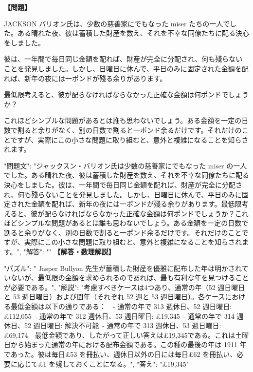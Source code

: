\documentclass[10pt,a4paper,oneside,openany]{ltjsbook}
\begin{document}
\begin{tcolorbox}[colback=softblue,colframe=primaryblue,title=\textbf{第 116 問：THE CONVERTED MISER.},arc=2mm,boxrule=1pt,breakable]
\textbf{【問題】}\par\vspace{0.3em}
JACKSON バリオン氏は、少数の慈善家にでもなった miser たちの一人でした。ある晴れた夜、彼は蓄積した財産を数え、それを不幸な同僚たちに配る決心をしました。

彼は、一年間で毎日同じ金額を配れば、財産が完全に分配され、何も殘らないことを発見しました。しかし、日曜日に休んで、平日のみに固定された金額を配れば、新年の夜には一ポンドが殘る余りがあります。

最低限考えると、彼が配らなければならなかった正確な金額は何ポンドでしょうか？

これほどシンプルな問題があるとは誰も思わないでしょう。ある金額を一定の日数で割ると余りがなく、別の日数で割ると一ポンド余るだけです。それだけのことですが、実際にこの小さな問題に取り組むと、意外と複雑になることを知らされます。

{
  "問題文": "ジャックスン・バリオン氏は少数の慈善家にでもなった miser の一人でした。ある晴れた夜、彼は蓄積した財産を数え、それを不幸な同僚たちに配る決心をしました。彼は、一年間で毎日同じ金額を配れば、財産が完全に分配され、何も殘らないことを発見しました。しかし、日曜日に休んで、平日のみに固定された金額を配れば、新年の夜には一ポンドが殘る余りがあります。最低限考えると、彼が配らなければならなかった正確な金額は何ポンドでしょうか？これほどシンプルな問題があるとは誰も思わないでしょう。ある金額を一定の日数で割ると余りがなく、別の日数で割ると一ポンド余るだけです。それだけのことですが、実際にこの小さな問題に取り組むと、意外と複雑になることを知らされます。",
  "解答": ""
}
\tcblower
\textbf{【解答・数理解説】}\par\vspace{0.3em}
{
    "パズル": " Jasper Bullyon 先生が蓄積した財産を優雅に配布した年は明かされていないが、最低限の金額を求められるのであれば、最も有利な年を見つけることが必要である。",
    "解説": "考慮すべきケースは4つあり、通常の年（52 週日曜日と 53 週日曜日）および閏年（それぞれ 52 週と 53 週日曜日）。各ケースにおける最低金額は以下の通りである：\
\
- 通常の年で 313 週休日、52 週日曜日: £112,055\
- 通常の年で 312 週休日、53 週日曜日: £19,345\
- 通常の年で 314 週休日、52 週日曜日: 解決不可能\
- 通常の年で 313 週休日、53 週日曜日: £69,174\
\
最低金額であり、したがって正しい答えは£19,345である。これは土曜日から始まった通常の年における配布金額である。この種の最後の年は 1911 年であった。彼は毎日£53 を冊払い、週休日以外の日には毎日£62 を冊払い、必要に応じて£1 を殘しておくことになる。",
    "答え": "£19,345"
}
\end{tcolorbox}
\end{document}
